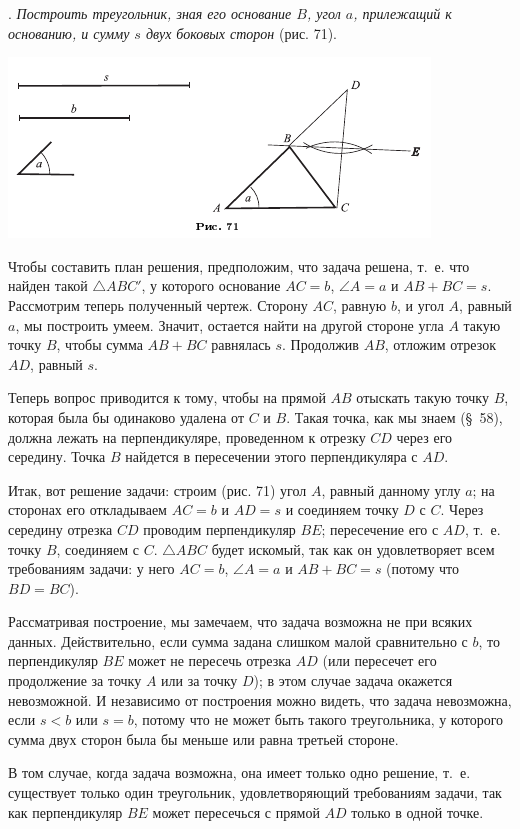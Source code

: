 \documentclass[oneside]{book}
\begin{document}
.
\emph{Построить треугольник, зная его основание $B$, угол $a$, прилежащий к основанию, и сумму $s$ двух боковых сторон} (рис. 71).

\includegraphics{pics/ris-71}

Чтобы составить план решения, предположим, что задача решена, т.~е. что найден такой $\triangle ABC'$, у которого основание $AC = b$, $\angle A=a$ и $AB+BC=s$.
Рассмотрим теперь полученный чертеж.
Сторону $AC$, равную $b$, и угол $A$, равный $a$, мы построить умеем.
Значит, остается найти на другой стороне угла $A$ такую точку $B$, чтобы сумма $AB+BC$ равнялась $s$.
Продолжив $AB$, отложим отрезок $AD$, равный $s$.

Теперь вопрос приводится к тому, чтобы на прямой $AB$ отыскать такую точку $B$, которая была бы одинаково удалена от $C$ и $B$.
Такая точка, как мы знаем (§~58), должна лежать на перпендикуляре, проведенном к отрезку $CD$ через его середину.
Точка $B$ найдется в пересечении этого перпендикуляра с $AD$.

Итак, вот решение задачи:
строим (рис. 71) угол $A$, равный данному углу $a$;
на сторонах его откладываем $AC=b$ и $AD=s$ и соединяем точку $D$ с $C$.
Через середину отрезка $CD$ проводим перпендикуляр $BE$;
пересечение его с $AD$, т.~е. точку $B$, соединяем с $C$.
$\triangle ABC$ будет  искомый, так как он удовлетворяет всем требованиям задачи:
у него $AC=b$, $\angle A = a$ и $AB+BC=s$ (потому что $BD=BC$).

Рассматривая построение, мы замечаем, что задача возможна не при всяких данных.
Действительно, если сумма задана слишком малой сравнительно с $b$, то перпендикуляр $BE$ может не пересечь отрезка $AD$ (или пересечет его продолжение за точку $A$ или за точку $D$);
в этом случае задача окажется невозможной.
И независимо от построения можно видеть, что задача невозможна, если $s<b$ или $s=b$, потому что не может быть такого треугольника, у которого сумма двух сторон была бы меньше или равна третьей стороне.

В том случае, когда задача возможна, она имеет только одно решение, т.~е. существует только один треугольник, удовлетворяющий требованиям задачи, так как перпендикуляр $BE$ может пересечься с прямой $AD$ только в одной точке.
\end{document}
